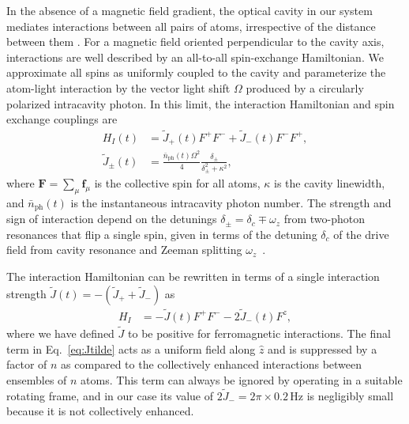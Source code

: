 \begin{bibunit}
In the absence of a magnetic field gradient, the optical cavity in our system mediates interactions between all pairs of atoms, irrespective of the distance between them \cite{davis2019photon,davis2020protecting}. For a magnetic field oriented perpendicular to the cavity axis, interactions are well described by an all-to-all spin-exchange Hamiltonian. We approximate all spins as uniformly coupled to the cavity and parameterize the atom-light interaction by the vector light shift $\Omega$ produced by a circularly polarized intracavity photon. In this limit, the interaction Hamiltonian and spin exchange couplings are
\begin{align}
    H_I(t) &=\tilde{J}_+ (t) F^+ F^- + \tilde{J}_-(t) F^- F^+, \\
    \tilde{J}_\pm(t) &= \frac{\bar{n}_\text{ph}(t)\Omega^2}{4}\frac{\delta_\pm}{\delta_\pm^2+\kappa^2},
\end{align}
where $\boldsymbol{F} = \sum_\mu {\mathbf{f}_\mu}$ is the collective spin for all atoms, $\kappa$ is the cavity linewidth, and $\bar{n}_\text{ph}(t)$ is the instantaneous intracavity photon number.  The strength and sign of interaction depend on the detunings $\delta_\pm = \delta_c \mp \omega_z$ from two-photon resonances that flip a single spin, given in terms of the detuning $\delta_c$ of the drive field from cavity resonance and Zeeman splitting $\omega_z$~\cite{davis2019photon, davis2020protecting}. 

The interaction Hamiltonian can be rewritten in terms of a single interaction strength $\tilde{J}(t) = -(\tilde{J}_+ + \tilde{J}_-)$ as
\begin{equation}\label{eq:Jtilde}
\begin{aligned}
    H_I  &=-\tilde{J}(t) F^+ F^- - 2\tilde{J}_-(t) F^z,
\end{aligned}
\end{equation}
where we have defined $\tilde{J}$ to be positive for ferromagnetic interactions.  The final term in Eq.~\eqref{eq:Jtilde} acts as a uniform field along $\hat{z}$ and is suppressed by a factor of $n$ as compared to the collectively enhanced interactions between ensembles of $n$ atoms. This term can always be ignored by operating in a suitable rotating frame, and in our case its value of $2\tilde{J}_- = 2\pi \times 0.2\,\text{Hz}$ is negligibly small because it is not collectively enhanced.


\end{bibunit}
